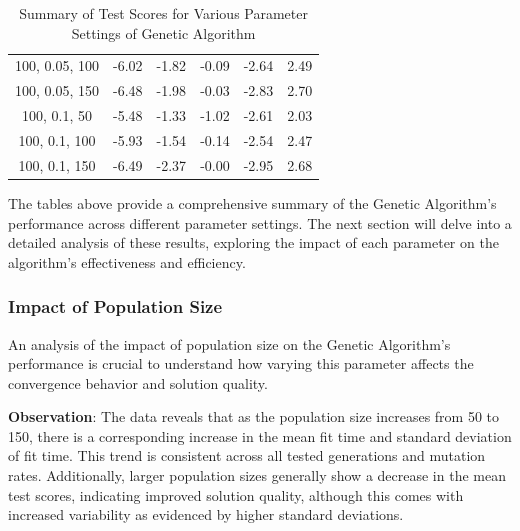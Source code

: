 \documentclass{article}
\begin{document}
\begin{table}[H]
{\begin{tabular}{|c|c|c|c|c|c|}
                100, 0.05, 100             & -6.02                      & -1.82                      & -0.09                      & -2.64                    & 2.49                    \\
                100, 0.05, 150             & -6.48                      & -1.98                      & -0.03                      & -2.83                    & 2.70                    \\
                100, 0.1, 50               & -5.48                      & -1.33                      & -1.02                      & -2.61                    & 2.03                    \\
                100, 0.1, 100              & -5.93                      & -1.54                      & -0.14                      & -2.54                    & 2.47                    \\
                100, 0.1, 150              & -6.49                      & -2.37                      & -0.00                      & -2.95                    & 2.68                    \\
                \hline
            \end{tabular}
        }
        \caption{Summary of Test Scores for Various Parameter Settings of Genetic Algorithm}
        \label{tab:ga_summary_test_scores}
    \end{table}


    The tables above provide a comprehensive summary of the Genetic Algorithm's performance across different parameter settings. The next section will delve into a detailed analysis of these results, exploring the impact of each parameter on the algorithm's effectiveness and efficiency.

    \subsubsection{Impact of Population Size}

    An analysis of the impact of population size on the Genetic Algorithm’s performance is crucial to understand how varying this parameter affects the convergence behavior and solution quality.

    \textbf{Observation}: The data reveals that as the population size increases from 50 to 150, there is a corresponding increase in the mean fit time and standard deviation of fit time. This trend is consistent across all tested generations and mutation rates. Additionally, larger population sizes generally show a decrease in the mean test scores, indicating improved solution quality, although this comes with increased variability as evidenced by higher standard deviations.
\end{document}
